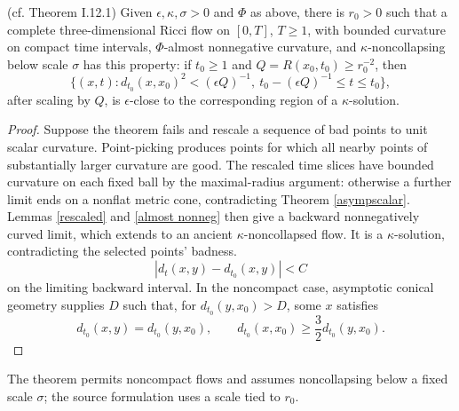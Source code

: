 \begin{theorem}
\label{thm:kl-canonical-neighborhood-theorem-compactness-canonical-neighborhoods}

(cf. Theorem I.12.1) \label{thmI.12.1}
Given $\epsilon,\kappa,\sigma>0$ and $\Phi$ as above, there is $r_0>0$ such
that a complete three-dimensional Ricci flow on $[0,T]$, $T\geq1$, with
bounded curvature on compact time intervals, $\Phi$-almost nonnegative
curvature, and $\kappa$-noncollapsing below scale $\sigma$ has this
property: if $t_0\geq1$ and $Q=R(x_0,t_0)\geq r_0^{-2}$, then
\[
\{(x,t):d_{t_0}(x,x_0)^2<(\epsilon Q)^{-1},\
t_0-(\epsilon Q)^{-1}\leq t\leq t_0\},
\]
after scaling by $Q$, is $\epsilon$-close to the corresponding region of a
$\kappa$-solution.
\end{theorem}
\begin{proof}
\sketch Suppose the theorem fails and rescale a sequence of bad points to
unit scalar curvature.  Point-picking produces points for which all nearby
points of substantially larger curvature are good.  The rescaled time slices
have bounded curvature on each fixed ball by the maximal-radius argument:
otherwise a further limit ends on a nonflat metric cone, contradicting
Theorem \ref{asympscalar}.  Lemmas \ref{rescaled} and
\ref{almost nonneg} then give a backward nonnegatively curved limit, which
extends to an ancient $\kappa$-noncollapsed flow.  It is a
$\kappa$-solution, contradicting the selected points' badness.
\begin{equation}\label{addbd}
|d_t(x,y)-d_{t_0}(x,y)|<C
\end{equation}
on the limiting backward interval.  In the noncompact case, asymptotic
conical geometry supplies $D$ such that, for $d_{t_0}(y,x_0)>D$, some $x$
satisfies
\begin{equation}\label{dists}
d_{t_0}(x,y)=d_{t_0}(y,x_0),\qquad
d_{t_0}(x,x_0)\geq\frac32d_{t_0}(y,x_0).
\end{equation}
\end{proof}
\begin{remark}
\label{rem:kl-canonical-neighborhood-theorem-existence-canonical-neighborhoods-5}
\source{kleiner-lott}
\dcref{Remark 52.8}


\label{wangg}
The theorem permits noncompact flows and assumes noncollapsing below a fixed
scale $\sigma$; the source formulation uses a scale tied to $r_0$.
\end{remark}
